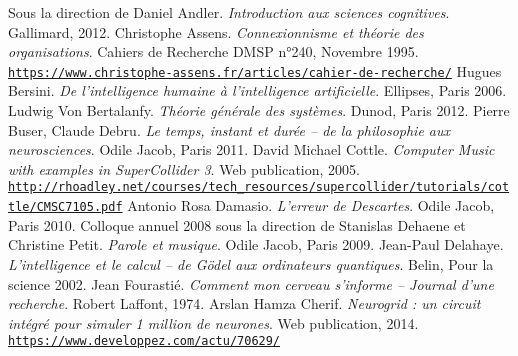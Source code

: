 \vspace{-1cm}
\renewcommand{\refname}{}
\makeatletter
\renewcommand\@biblabel[1]{}
\makeatother
\renewcommand\bibpreamble{$\rightarrow$ Here is the list of books, articles and  web pages that have been used in some way in the development of this work.\bigskip}

\begin{thebibliography}{99}
        		 
        \bibitem[-, 2012]{}Sous la direction de Daniel Andler. \textit{Introduction aux sciences cognitives}. Gallimard, 2012.
        \bibitem[-, 1995]{}Christophe Assens. \textit{Connexionnisme et théorie des organisations}. Cahiers de Recherche DMSP n°240, Novembre 1995.\\ \href{https://www.christophe-assens.fr/articles/cahier-de-recherche/}{\scriptsize{\texttt{https://www.christophe-assens.fr/articles/cahier-de-recherche/}}} \normalsize{}
        \bibitem[-, 2006]{}Hugues Bersini. \textit{De l'intelligence humaine à l'intelligence artificielle}. Ellipses, Paris 2006.
        \bibitem[-, 2012]{}Ludwig Von Bertalanfy. \textit{Théorie générale des systèmes}. Dunod, Paris 2012.
        \bibitem[-, 2011]{}Pierre Buser, Claude Debru. \textit{Le temps, instant et durée -- de la philosophie aux neurosciences}. Odile Jacob, Paris 2011.
        \bibitem[-, 2005]{}David Michael Cottle. \textit{Computer Music with examples in SuperCollider 3}. Web publication, 2005.\\ \href{http://rhoadley.net/courses/tech\_resources/supercollider/tutorials/cottle/CMSC7105.pdf}{\scriptsize{\texttt{http://rhoadley.net/courses/tech\_resources/supercollider/tutorials/cottle/CMSC7105.pdf}}} \normalsize{}
        \bibitem[-, 2010]{}Antonio Rosa Damasio. \textit{L'erreur de Descartes}. Odile Jacob, Paris 2010.
        \bibitem[-, 2009]{}Colloque annuel 2008 sous la direction de Stanislas Dehaene et Christine Petit. \textit{Parole et musique}. Odile Jacob, Paris 2009.
        \bibitem[-, 2002]{}Jean-Paul Delahaye. \textit{L'intelligence et le calcul -- de Gödel aux ordinateurs quantiques}. Belin, Pour la science 2002.
        \bibitem[-, 1974]{}Jean Fourastié. \textit{Comment mon cerveau s'informe -- Journal d'une recherche}. Robert Laffont, 1974.
        \bibitem[-, 2014]{}Arslan Hamza Cherif. \textit{Neurogrid : un circuit intégré pour simuler 1 million de neurones}. Web publication, 2014.\\ \href{https://www.developpez.com/actu/70629/Neurogrid-un-circuit-integre-pour-simuler-1-million-de-neurones-9-000-fois-mieux-qu-une-simulation-sur-ordinateur/}{\scriptsize{\texttt{https://www.developpez.com/actu/70629/}}} \normalsize{}

\end{thebibliography}
